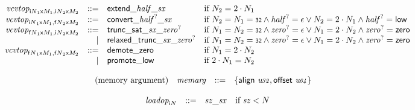 $$
\begin{array}[t]{@{}lrrl@{}l@{}}
& {{\mathit{vcvtop}}}_{{{{\mathsf{i}}{N}}_1}{\mathsf{x}}{M_1}, {{{\mathsf{i}}{N}}_2}{\mathsf{x}}{M_2}} & ::= & {\mathsf{extend}}{\mathsf{\_}}{{\mathit{half}}}{\mathsf{\_}}{{\mathit{sx}}} & \quad \mbox{if}~ N_2 = 2 \cdot N_1 \\
& {{\mathit{vcvtop}}}_{{{{\mathsf{i}}{N}}_1}{\mathsf{x}}{M_1}, {{{\mathsf{f}}{N}}_2}{\mathsf{x}}{M_2}} & ::= & {\mathsf{convert}}{\mathsf{\_}}{{{\mathit{half}}^?}}{\mathsf{\_}}{{\mathit{sx}}} & \quad \mbox{if}~ N_2 = N_1 = \mathsf{{\scriptstyle 32}} \land {{\mathit{half}}^?} = \epsilon \lor N_2 = 2 \cdot N_1 \land {{\mathit{half}}^?} = \mathsf{low} \\
& {{\mathit{vcvtop}}}_{{{{\mathsf{f}}{N}}_1}{\mathsf{x}}{M_1}, {{{\mathsf{i}}{N}}_2}{\mathsf{x}}{M_2}} & ::= & {\mathsf{trunc\_sat}}{\mathsf{\_}}{{\mathit{sx}}}{\mathsf{\_}}{{{\mathit{zero}}^?}} & \quad \mbox{if}~ N_1 = N_2 = \mathsf{{\scriptstyle 32}} \land {{\mathit{zero}}^?} = \epsilon \lor N_1 = 2 \cdot N_2 \land {{\mathit{zero}}^?} = \mathsf{zero} \\
& & | & {\mathsf{relaxed\_trunc}}{\mathsf{\_}}{{\mathit{sx}}}{\mathsf{\_}}{{{\mathit{zero}}^?}} & \quad \mbox{if}~ N_1 = N_2 = \mathsf{{\scriptstyle 32}} \land {{\mathit{zero}}^?} = \epsilon \lor N_1 = 2 \cdot N_2 \land {{\mathit{zero}}^?} = \mathsf{zero} \\
& {{\mathit{vcvtop}}}_{{{{\mathsf{f}}{N}}_1}{\mathsf{x}}{M_1}, {{{\mathsf{f}}{N}}_2}{\mathsf{x}}{M_2}} & ::= & {\mathsf{demote}}{\mathsf{\_}}{\mathsf{zero}} & \quad \mbox{if}~ N_1 = 2 \cdot N_2 \\
& & | & {\mathsf{promote}}{\mathsf{\_}}{\mathsf{low}} & \quad \mbox{if}~ 2 \cdot N_1 = N_2 \\
\end{array}
$$

\vspace{1ex}

$$
\begin{array}[t]{@{}lrrl@{}l@{}}
\mbox{(memory argument)} & {\mathit{memarg}} & ::= & \{ \begin{array}[t]{@{}l@{}l@{}}
\mathsf{align}~{\mathit{u{\kern-0.1em\scriptstyle 32}}} ,  \mathsf{offset}~{\mathit{u{\kern-0.1em\scriptstyle 64}}} \} \\
\end{array} \\
\end{array}
$$

$$
\begin{array}[t]{@{}lrrl@{}l@{}}
& {{\mathit{loadop}}}_{{\mathsf{i}}{N}} & ::= & {{\mathit{sz}}}{\mathsf{\_}}{{\mathit{sx}}} & \quad \mbox{if}~ {\mathit{sz}} < N \\
\end{array}
$$

